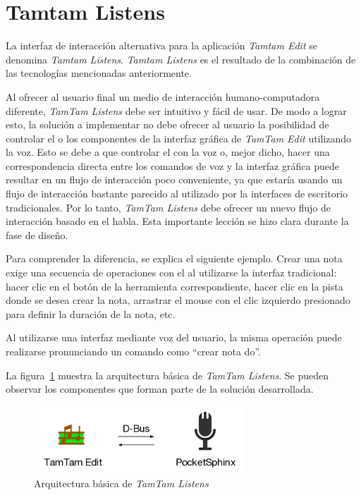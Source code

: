 \section{Tamtam Listens}
\label{sec:tamtam-listens}
La interfaz de interacci\'on alternativa para la aplicaci\'on \emph{Tamtam Edit} se denomina  
\emph{Tamtam Listens}. \emph{Tamtam Listens} es el resultado de la combinaci\'on
de las tecnolog\'ias mencionadas anteriormente.


Al ofrecer al usuario final un medio de interacci\'on humano-computadora diferente, \emph{TamTam Listens} debe
ser intuitivo y f\'acil de usar. De modo a lograr esto, la soluci\'on a implementar no debe ofrecer al usuario
la posibilidad de controlar el  o los componentes de la interfaz gr\'afica de \emph{TamTam Edit}
utilizando la voz. Esto se debe a que controlar el  con la voz o, mejor dicho, hacer una
correspondencia directa entre los comandos de voz y la interfaz gr\'afica puede resultar en un flujo de interacci\'on
poco conveniente, ya que estar\'ia usando un flujo de interacci\'on bastante parecido al utilizado por la interfaces
de escritorio tradicionales. Por lo tanto, \emph{TamTam Listens} debe ofrecer un nuevo flujo de interacci\'on basado
en el habla. Esta importante lecci\'on se hizo clara durante la fase de dise\~no.

Para comprender la diferencia, se explica el siguiente ejemplo. 
Crear una nota exige una secuencia de operaciones con el  al utilizarse la
interfaz tradicional: hacer clic en el bot\'on de la herramienta correspondiente, hacer clic en la pista
donde se desea crear la nota, arrastrar el mouse con el clic izquierdo presionado para definir la duraci\'on
de la nota, etc.

Al utilizarse una interfaz mediante voz del usuario, la misma operaci\'on puede realizarse pronunciando un
comando como ``crear nota do''.


La figura~\ref{figure:tamtam-listens-arq} muestra la arquitectura b\'asica de \emph{TamTam Listens}. Se pueden
observar los componentes que forman parte de la soluci\'on desarrollada.

\begin{figure}[H] 
\centering
\includegraphics[width=0.7\textwidth]{./graphics/tamtam-listens-arq.png}
\caption{Arquitectura b\'asica de \emph{TamTam Listens}}
\label{figure:tamtam-listens-arq}
\end{figure}


